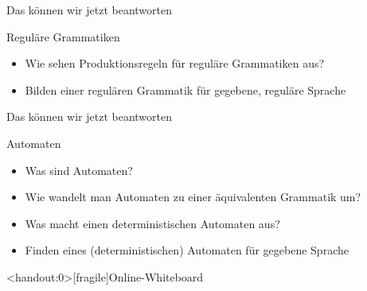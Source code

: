 \begin{frame}[fragile]{Das können wir jetzt beantworten}
  \begin{alertblock}{Reguläre Grammatiken}
    \begin{itemize}
      \item Wie sehen Produktionsregeln für reguläre Grammatiken aus?
      \item Bilden einer regulären Grammatik für gegebene, reguläre Sprache
    \end{itemize}
  \end{alertblock}
\end{frame}

\begin{frame}[fragile]{Das können wir jetzt beantworten}
  \begin{alertblock}{Automaten}
    \begin{itemize}
      \item Was sind Automaten?
      \item Wie wandelt man Automaten zu einer äquivalenten Grammatik um?
      \item Was macht einen deterministischen Automaten aus?
      \item Finden eines (deterministischen) Automaten für gegebene Sprache
    \end{itemize}
  \end{alertblock}
\end{frame}




\appendix

\begin{frame}<handout:0>[fragile]{Online-Whiteboard}
  \phantom{text}
\end{frame}


